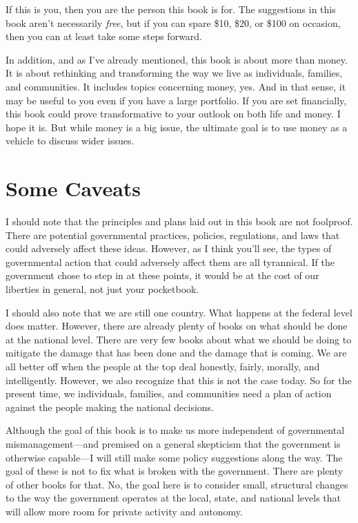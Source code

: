 {\color{black}
If this is you, then you are the person this book is for. The
suggestions in this book aren’t necessarily \textit{free}, but if you
can spare \$10, \$20, or \$100 on occasion, then you can at least take
some steps forward.}

{\color{black}
In addition, and
as I’ve already
mentioned, this book is about more than money. It is about rethinking
and transforming the way we live as individuals, families, and
communities. It includes topics concerning money, yes. And in that
sense, it may be useful to you even if you have a large portfolio. If
you are set financially, this book could prove transformative to your
outlook on both life and money.
I hope it is. But
while money is a big issue, the ultimate goal is to use money as a
vehicle to discuss wider issues. }

\section[Some Caveats]{Some Caveats}
{\color{black}
I should note that the principles and plans laid out in this book are
not foolproof. There are potential governmental practices, policies,
regulations, and laws that could adversely affect these ideas. However,
as I think you’ll see, the types of governmental action that could
adversely affect them are all tyrannical. If the government chose to
step in at these points, it would be at the cost of our liberties in
general, not just your pocketbook. }

{\color{black}
I should also note that we are still one country. What happens at the
federal level does matter. However, there are already plenty of books
on what should be done at the national level. There are very few books
about what we should be doing to mitigate the damage that has been done
and the damage that is coming. We are all better off when the people at
the top deal honestly, fairly, morally, and intelligently. However, we
also recognize that this is not the case today. So for the present
time, we individuals, families, and communities need a plan of action
against the people making the national decisions.}

{\color{black}
Although the goal of this book is to make us more independent of
governmental
mismanagement—and
premised on a general skepticism that the government is otherwise
capable—I will still make some policy suggestions along the way. The
goal of these is not to fix what is broken with the government. There
are plenty of other books for that. No, the goal here is to  consider
small, structural changes to the way the government operates at the
local, state, and national levels
that will allow more
room for private activity and autonomy.}

